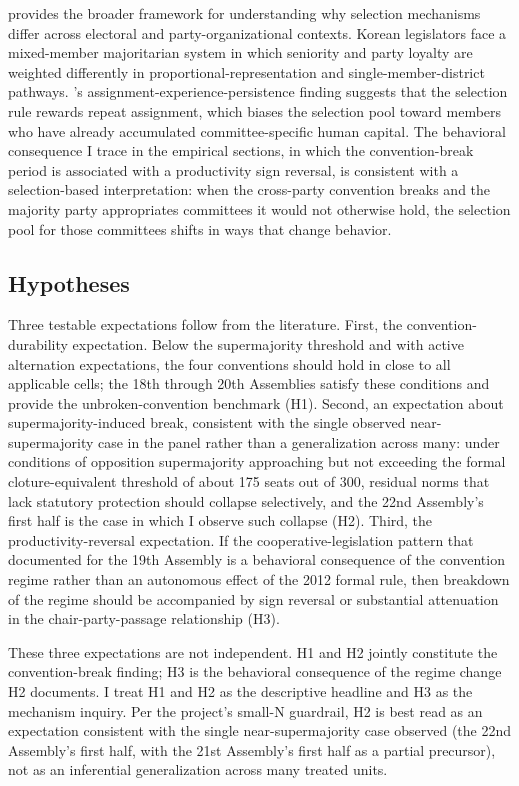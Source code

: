 \documentclass[11pt]{article}
\begin{document}
\citet{careyshugart1995} provides the broader framework for understanding why selection mechanisms differ across electoral and party-organizational contexts. Korean legislators face a mixed-member majoritarian system in which seniority and party loyalty are weighted differently in proportional-representation and single-member-district pathways. \citet{kang2024}'s assignment-experience-persistence finding suggests that the selection rule rewards repeat assignment, which biases the selection pool toward members who have already accumulated committee-specific human capital. The behavioral consequence I trace in the empirical sections, in which the convention-break period is associated with a productivity sign reversal, is consistent with a selection-based interpretation: when the cross-party convention breaks and the majority party appropriates committees it would not otherwise hold, the selection pool for those committees shifts in ways that change behavior.

\subsection{Hypotheses}

Three testable expectations follow from the literature. First, the convention-durability expectation. Below the supermajority threshold and with active alternation expectations, the four \citet{jung2018} conventions should hold in close to all applicable cells; the 18th through 20th Assemblies satisfy these conditions and provide the unbroken-convention benchmark (H1). Second, an expectation about supermajority-induced break, consistent with the single observed near-supermajority case in the panel rather than a generalization across many: under conditions of opposition supermajority approaching but not exceeding the formal cloture-equivalent threshold of about 175 seats out of 300, residual norms that lack statutory protection should collapse selectively, and the 22nd Assembly's first half is the case in which I observe such collapse (H2). Third, the productivity-reversal expectation. If the cooperative-legislation pattern that \citet{yunan2018} documented for the 19th Assembly is a behavioral consequence of the convention regime rather than an autonomous effect of the 2012 formal rule, then breakdown of the regime should be accompanied by sign reversal or substantial attenuation in the chair-party-passage relationship (H3).

These three expectations are not independent. H1 and H2 jointly constitute the convention-break finding; H3 is the behavioral consequence of the regime change H2 documents. I treat H1 and H2 as the descriptive headline and H3 as the mechanism inquiry. Per the project's small-N guardrail, H2 is best read as an expectation consistent with the single near-supermajority case observed (the 22nd Assembly's first half, with the 21st Assembly's first half as a partial precursor), not as an inferential generalization across many treated units.
\end{document}
